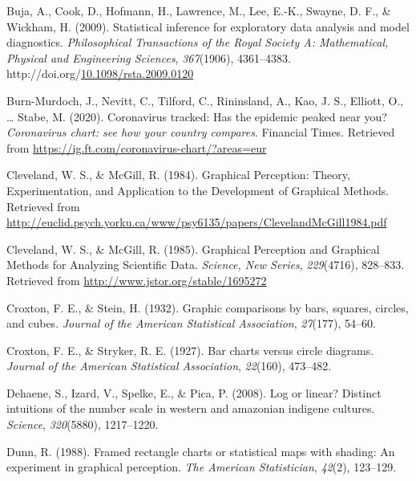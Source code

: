\documentclass[print]{nuthesis}
\newlength{\cslhangindent}
\newenvironment{CSLReferences}%
{\setlength{\parindent}{0pt}%
\everypar{\setlength{\hangindent}{\cslhangindent}}\ignorespaces}%
{\par}
\begin{document}
\begin{CSLReferences}{1}{0}
\leavevmode\hypertarget{ref-buja_statistical_2009}{}%
Buja, A., Cook, D., Hofmann, H., Lawrence, M., Lee, E.-K., Swayne, D. F., \& Wickham, H. (2009). Statistical inference for exploratory data analysis and model diagnostics. \emph{Philosophical Transactions of the Royal Society A: Mathematical, Physical and Engineering Sciences}, \emph{367}(1906), 4361--4383. http://doi.org/\href{https://doi.org/10.1098/rsta.2009.0120}{10.1098/rsta.2009.0120}

\leavevmode\hypertarget{ref-burnmurdoch_2020}{}%
Burn-Murdoch, J., Nevitt, C., Tilford, C., Rininsland, A., Kao, J. S., Elliott, O., \ldots{} Stabe, M. (2020). Coronavirus tracked: Has the epidemic peaked near you? \emph{Coronavirus chart: see how your country compares}. Financial Times. Retrieved from \url{https://ig.ft.com/coronavirus-chart/?areas=eur}

\leavevmode\hypertarget{ref-cleveland_graphical_1984}{}%
Cleveland, W. S., \& McGill, R. (1984). Graphical {Perception}: {Theory}, {Experimentation}, and {Application} to the {Development} of {Graphical} {Methods}. Retrieved from \url{http://euclid.psych.yorku.ca/www/psy6135/papers/ClevelandMcGill1984.pdf}

\leavevmode\hypertarget{ref-cleveland_graphical_1985}{}%
Cleveland, W. S., \& McGill, R. (1985). Graphical {Perception} and {Graphical} {Methods} for {Analyzing} {Scientific} {Data}. \emph{Science, New Series}, \emph{229}(4716), 828--833. Retrieved from \url{http://www.jstor.org/stable/1695272}

\leavevmode\hypertarget{ref-croxton1932graphic}{}%
Croxton, F. E., \& Stein, H. (1932). Graphic comparisons by bars, squares, circles, and cubes. \emph{Journal of the American Statistical Association}, \emph{27}(177), 54--60.

\leavevmode\hypertarget{ref-croxton1927bar}{}%
Croxton, F. E., \& Stryker, R. E. (1927). Bar charts versus circle diagrams. \emph{Journal of the American Statistical Association}, \emph{22}(160), 473--482.

\leavevmode\hypertarget{ref-dehaene2008log}{}%
Dehaene, S., Izard, V., Spelke, E., \& Pica, P. (2008). Log or linear? Distinct intuitions of the number scale in western and amazonian indigene cultures. \emph{Science}, \emph{320}(5880), 1217--1220.

\leavevmode\hypertarget{ref-dunn1988framed}{}%
Dunn, R. (1988). Framed rectangle charts or statistical maps with shading: An experiment in graphical perception. \emph{The American Statistician}, \emph{42}(2), 123--129.


\end{CSLReferences}
\end{document}
